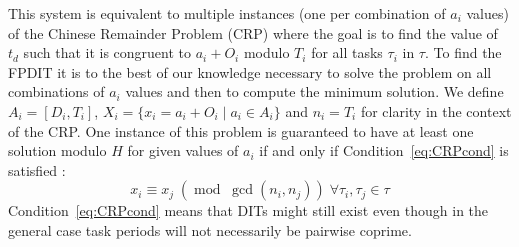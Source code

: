 \documentclass[conference]{IEEEtran}
\begin{document}
		This system is equivalent to multiple instances (one per combination of $a_i$
		values) of the Chinese Remainder Problem (CRP) where the goal is to find the
		value of $t_d$ such that it is congruent to $a_i+O_i$ modulo $T_i$ for all
		tasks $\tau_i$ in $\tau$. To find the FPDIT it is to the best of our knowledge
		necessary to solve the problem on all combinations of $a_i$ values and then
		to compute the minimum solution. We define $A_i = [D_i,T_i]$, $X_i = \{x_i
		= a_i+O_i \mid a_i \in A_i\}$ and $n_i = T_i$ for clarity in the context of
		the CRP.
		One instance of this problem is guaranteed to have at least one solution modulo $H$ for given values of $a_i$ if and only if
		Condition~\ref{eq:CRPcond} is satisfied \cite{knuth1969art}:
		\begin{equation}
			\label{eq:CRPcond}
			x_i \equiv x_j \; (\operatorname{mod} \; \operatorname{gcd}(n_i, n_j))
			\; \forall \tau_i,\tau_j \in \tau
		\end{equation}
		Condition~\ref{eq:CRPcond} means that DITs might still exist even though in
		the general case task periods will not necessarily be pairwise coprime.
%
%
\end{document}
